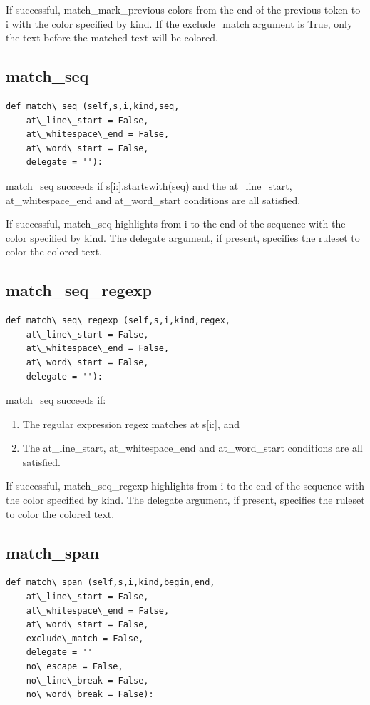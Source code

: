 \documentclass[a4paper,10pt,english]{sphinxmanual}
\begin{document}
If successful, match\_mark\_previous colors from the end of the previous token to i
with the color specified by kind.
If the exclude\_match argument is True, only the text before the matched text will be colored.


\subsection{match\_seq}
\label{coloring:match-seq}
\begin{Verbatim}[commandchars=\\\{\}]
def match\_seq (self,s,i,kind,seq,
    at\_line\_start = False,
    at\_whitespace\_end = False,
    at\_word\_start = False,
    delegate = ''):
\end{Verbatim}

match\_seq succeeds if s{[}i:{]}.startswith(seq) and
the at\_line\_start, at\_whitespace\_end and at\_word\_start conditions are all satisfied.

If successful, match\_seq highlights from i to the end of the sequence
with the color specified by kind.
The delegate argument, if present, specifies the ruleset to color the colored text.


\subsection{match\_seq\_regexp}
\label{coloring:match-seq-regexp}
\begin{Verbatim}[commandchars=\\\{\}]
def match\_seq\_regexp (self,s,i,kind,regex,
    at\_line\_start = False,
    at\_whitespace\_end = False,
    at\_word\_start = False,
    delegate = ''):
\end{Verbatim}

match\_seq succeeds if:
\begin{enumerate}
\item {} 
The regular expression regex matches at s{[}i:{]}, and

\item {} 
The at\_line\_start, at\_whitespace\_end and at\_word\_start conditions are all satisfied.

\end{enumerate}

If successful, match\_seq\_regexp highlights from i to the end of the sequence
with the color specified by kind.
The delegate argument, if present, specifies the ruleset to color the colored text.


\subsection{match\_span}
\label{coloring:match-span}
\begin{Verbatim}[commandchars=\\\{\}]
def match\_span (self,s,i,kind,begin,end,
    at\_line\_start = False,
    at\_whitespace\_end = False,
    at\_word\_start = False,
    exclude\_match = False,
    delegate = ''
    no\_escape = False,
    no\_line\_break = False,
    no\_word\_break = False):
\end{Verbatim}
\end{document}
